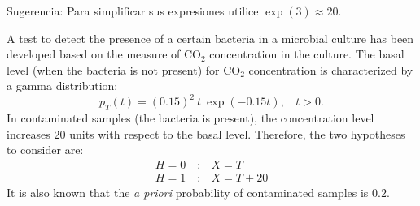 Sugerencia: Para simplificar sus expresiones utilice $\exp(3) \approx 20$.
\begin{solution}
\end{solution}

\else
\question[25] %

A test to detect the presence of a certain bacteria in a microbial culture has been developed based on the measure of $\text{CO}_2$ concentration in the culture. The basal level (when the bacteria is not present) for $\text{CO}_2$ concentration is characterized by a gamma distribution:
$$ p_T(t) = (0.15)^2 ~  t ~  \exp(-0.15 t), ~~~~t > 0.$$
In contaminated samples (the bacteria is present), the concentration level increases 20 units with respect to the basal level. Therefore, the two hypotheses to consider are:
\begin{equation}
\begin{array}{ll}
H=0\quad: & X = T \\
H=1\quad: & X = T + 20
\end{array}
\end{equation}
It is also known that the {\em a priori} probability of contaminated samples is $0.2$.

